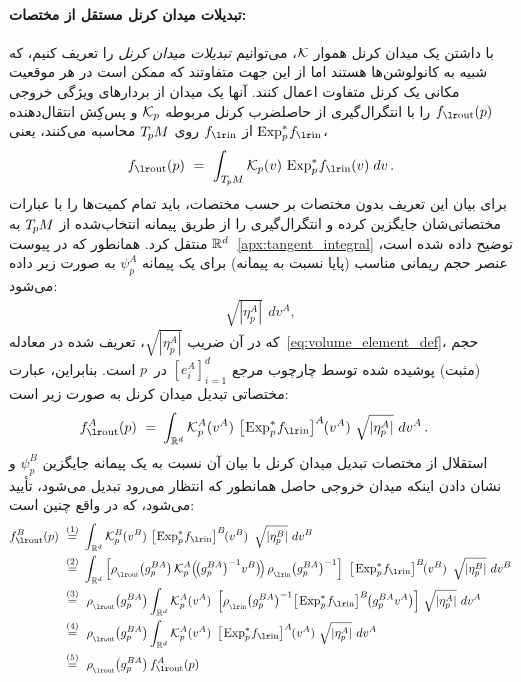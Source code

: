 \paragraph{تبدیلات میدان کرنل مستقل از مختصات:}
با داشتن یک میدان کرنل هموار $\mathcal{K}$، می‌توانیم \emph{تبدیلات میدان کرنل} را تعریف کنیم، که شبیه به کانولوشن‌ها هستند اما از این جهت متفاوتند که ممکن است در هر موقعیت مکانی یک کرنل متفاوت اعمال کنند.
آنها یک میدان از بردارهای ویژگی خروجی $\fout(p)$ را با
انتگرال‌گیری از حاصلضرب کرنل مربوطه $\mathcal{K}_p$ و پس‌کِش انتقال‌دهنده $\Expspfin$ از $\fin$ روی $T_{\mkern-1.5mu p}\mkern-.5muM$ محاسبه می‌کنند، یعنی،
\begin{align}\label{eq:kft_coord_free}
	\fout(p)\ =\ 
	\int_{\TpM}
	\Kp(v) \,
	\Expspfin(v) \;
	dv \,.
\end{align}
برای بیان این تعریف بدون مختصات بر حسب مختصات، باید تمام کمیت‌ها را با عبارات مختصاتی‌شان جایگزین کرده و انتگرال‌گیری را از طریق پیمانه انتخاب‌شده از $T_{\mkern-1.5mu p}\mkern-.5muM$ به $\mathbb{R}^d$ منتقل کرد.
همانطور که در پیوست~\ref{apx:tangent_integral} توضیح داده شده است، عنصر حجم ریمانی مناسب (پایا نسبت به پیمانه) برای یک پیمانه $\psi_p^A$ به صورت زیر داده می‌شود:
\begin{align}
	\sqrt{|\eta_p^A|} \,\ dv^A ,
\end{align}
که در آن ضریب $\sqrt{|\eta_p^A|}$، تعریف شده در معادله~\eqref{eq:volume_element_def}، حجم (مثبت) پوشیده شده توسط چارچوب مرجع $[e_i^A]_{i=1}^d$ در~$p$ است.
بنابراین، عبارت مختصاتی تبدیل میدان کرنل به صورت زیر است:
\begin{align}\label{eq:kft_coord_expression}
	\fout^A(p)
	\ =&\ 
	\int_{\R^d}
	\Kp^A(v^A) \ 
	\big[\mkern-2mu \Expspfin\big]^A \mkern-1mu(v^A) \ 
	\sqrt{|\eta_p^A|}\ dv^A
	\,.
\end{align}
استقلال از مختصات تبدیل میدان کرنل با بیان آن نسبت به یک پیمانه جایگزین $\psi_p^B$ و نشان دادن اینکه میدان خروجی حاصل همانطور که انتظار می‌رود تبدیل می‌شود، تأیید می‌شود، که در واقع چنین است:
\begin{align}\label{eq:kft_coordinate_independence}
	\fout^B(p)\ 
	\overset{(1)}{=}&\ 
	\int_{\R^d}
	\Kp^B(v^B) \ 
	\big[\mkern-2mu \Expspfin\big]^B \mkern-2mu(v^B) \,\ 
	\sqrt{|\eta_p^B|}\ dv^B
	\notag \\ 
	\overset{(2)}{=}&\ 
	\int_{\R^d}
	\Big[ \rhoout\big(g_p^{BA}\big)\, \Kp^A\pig(\! \big(g_p^{BA}\big)^{-1} v^B \big)\!\pig)\, \rhoin\big(g_p^{BA}\big)^{-1} \Big] \,\ 
	\big[\mkern-1mu \Expspfin\big]^B \mkern-2mu(v^B) \,\ 
	\sqrt{|\eta_p^B|}\ dv^B
	\notag \\ 
	\overset{(3)}{=}&\ \ 
	\rhoout\big(g_p^{BA}\big)
	\int_{\R^d}
	\Kp^A(v^A) \,\ 
	\Big[ \rhoin\big(g_p^{BA}\big)^{-1} \big[\mkern-1mu \Expspfin\big]^B \mkern-2mu \big( g_p^{BA} v^A\big) \Big] \ 
	\sqrt{|\eta_p^A|}\ dv^A
	\notag \\ 
	\overset{(4)}{=}&\ \ 
	\rhoout\big(g_p^{BA}\big)
	\int_{\R^d}
	\Kp^A(v^A) \,\ 
	\big[\mkern-1mu \Expspfin\big]^A \mkern-1mu (v^A) \ 
	\sqrt{|\eta_p^A|}\ dv^A
	\notag \\ 
	\overset{(5)}{=}&\ \ 
	\rhoout\big(g_p^{BA}\big) \, \fout^A(p)
\end{align}
